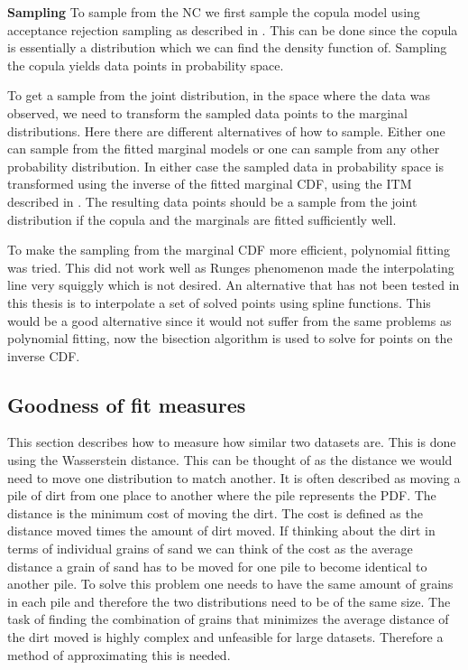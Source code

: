 \textbf{Sampling}
To sample from the \gls{NC} we first sample the copula model using acceptance rejection sampling as described in . This can be done since the copula is essentially a distribution which we can find the density function of. Sampling the copula yields data points in probability space. 

To get a sample from the joint distribution, in the space where the data was observed, we need to transform the sampled data points to the marginal distributions. Here there are different alternatives of how to sample. Either one can sample from the fitted marginal models or one can sample from any other probability distribution. In either case the sampled data in probability space is transformed using the inverse of the fitted marginal \gls{CDF}, using the \gls{ITM} described in . The resulting data points should be a sample from the joint distribution if the copula and the marginals are fitted sufficiently well. 

\begin{generalinstructions}
     To make the sampling from the marginal \gls{CDF} more efficient, polynomial fitting was tried. This did not work well as Runges phenomenon made the interpolating line very squiggly which is not desired. An alternative that has not been tested in this thesis is to interpolate a set of solved points using spline functions. This would be a good alternative since it would not suffer from the same problems as polynomial fitting, now the bisection algorithm is used to solve for points on the inverse \gls{CDF}.   
\end{generalinstructions}



\subsection{Goodness of fit measures}\label{sec:GoodnessOfFit}
This section describes how to measure how similar two datasets are. This is done using the Wasserstein distance. This can be thought of as the distance we would need to move one distribution to match another. It is often described as moving a pile of dirt from one place to another where the pile represents the \gls{PDF}. The distance is the minimum cost of moving the dirt. The cost is defined as the distance moved times the amount of dirt moved. If thinking about the dirt in terms of individual grains of sand we can think of the cost as the average distance a grain of sand has to be moved for one pile to become identical to another pile. To solve this problem one needs to have the same amount of grains in each pile and therefore the two distributions need to be of the same size. The task of finding the combination of grains that minimizes the average distance of the dirt moved is highly complex and unfeasible for large datasets. Therefore a method of approximating this is needed. 

